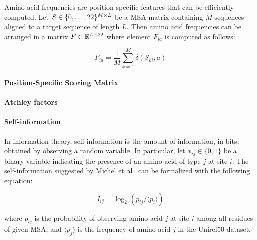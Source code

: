             Amino acid frequencies are position-specific features that can be efficiently computed.
            Let $S \in \{0, \ldots, 22\}^{M \times L}$ be a 
            MSA matrix containing $M$ sequences aligned to a target
            sequence of length $L$. Then amino acid frequencies can be arranged
            in a matrix $F \in \mathbb{R}^{L \times 22}$
            where element $F_{ia}$ is computed as follows:

            \begin{equation}
                F_{ia} = \frac{1}{M} \sum\limits_{k=1}^M \delta(S_{ki}, a)
            \end{equation}

        \paragraph{Position-Specific Scoring Matrix}


        \paragraph{Atchley factors}


        \paragraph{Self-information}

            In information theory, self-information is the amount of information, in bits,
            obtained by observing a random variable. In particular, let $x_{ij} \in \{0, 1\}$ be
            a binary variable indicating the presence of an amino acid of type $j$ at site $i$.
            The self-information suggested by Michel et al~\cite{Michel383133} can be formalized
            with the following equation:

            \begin{equation}
                I_{ij} = \log_2 (p_{ij} / \langle p_i \rangle)
            \end{equation}

            where $p_{ij}$ is the probability of observing amino acid $j$ at site $i$ among all residues
            of given MSA, and $\langle p_j \rangle$ is the frequency of amino acid $j$
            in the Uniref50 dataset.

